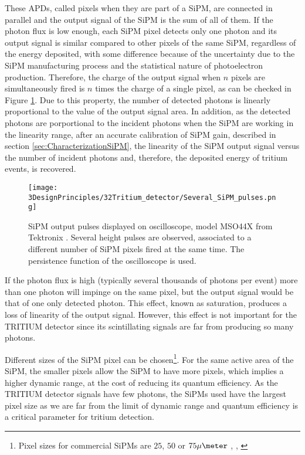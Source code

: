 These APDs, called pixels when they are part of a SiPM, are connected in parallel and the output signal of the SiPM is the sum of all of them. If the photon flux is low enough, each SiPM pixel detects only one photon and its output signal is similar compared to other pixels of the same SiPM, regardless of the energy deposited, with some difference because of the uncertainty due to the SiPM manufacturing process and the statistical nature of photoelectron production. Therefore, the charge of the output signal when $n$ pixels are simultaneously fired is $n$ times the charge of a single pixel, as can be checked in Figure \ref{fig:PulsesOfSiPM}. Due to this property, the number of detected photons is linearly proportional to the value of the output signal area. In addition, as the detected photons are porportional to the incident photons when the SiPM are working in the linearity range, after an accurate calibration of SiPM gain, described in section \ref{sec:CharacterizationSiPM}, the linearity of the SiPM output signal versus the number of incident photons and, therefore, the deposited energy of tritium events, is recovered.

\begin{figure}[h]
\centering
\texttt{[image: 3DesignPrinciples/32Tritium\_detector/Several\_SiPM\_pulses.png]}
\caption{SiPM output pulses displayed on oscilloscope, model MSO44X from Tektronix \cite{Oscilloscope}. Several height pulses are observed, associated to a different number of  SiPM pixels fired at the same time. The persistence function of the oscilloscope is used.\label{fig:PulsesOfSiPM}}
\end{figure}

If the photon flux is high (typically several thousands of photons per event) more than one photon will impinge on the same pixel, but the output signal would be that of one only detected photon. This effect, known as saturation, produces a loss of linearity of the output signal. However, this effect is not important for the TRITIUM detector since its scintillating signals are far from producing so many photons. %

Different sizes of the SiPM pixel can be chosen\footnote{Pixel sizes for commercial SiPMs are $25$, $50$ or $75\mu\meter$ \cite{DataSheetHammamatsu_1_SiPM_25}, \cite{DataSheetHammamatsu_1_SiPM_50}, \cite{DataSheetHammamatsu_1_SiPM_75}}. For the same active area of the SiPM, the smaller pixels allow the SiPM to have more pixels, which implies a higher dynamic range, at the cost of reducing its quantum efficiency. As the TRITIUM detector signals have few photons, the SiPMs used have the largest pixel size as we are far from the limit of dynamic range and quantum efficiency is a critical parameter for tritium detection.

